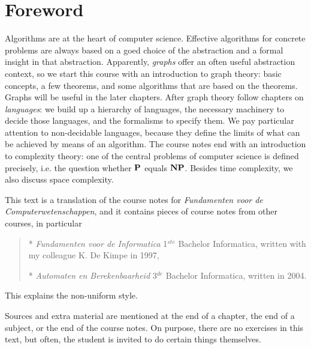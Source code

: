 \chapter{Foreword}

Algorithms are at the heart of computer science. Effective algorithms
for concrete problems are always based on a goed choice of the
abstraction and a formal insight in that abstraction. Apparently, {\em
graphs} offer an often useful abstraction context, so we start this
course with an introduction to graph theory: basic concepts, a few
theorems, and some algorithms that are based on the theorems. Graphs
will be useful in the later chapters. After graph theory follow
chapters on {\em languages}: we build up a hierarchy of languages,
the necessary machinery to decide those languages, and the formalisms
to specify them. We pay particular attention to non-decidable
languages, because they define the limits of what can be achieved by
means of an algorithm. The course notes end with an introduction to
complexity theory: one of the central problems of computer science is
defined precisely, i.e. the question whether $\P$ equals
$\NP$. Besides time complexity, we also discuss space complexity.


This text is a translation of the course notes for {\em Fundamenten
voor de Computerwetenschappen}, and it contains pieces of course
notes from other courses, in particular
\begin{verse}
* {\em Fundamenten voor de Informatica} 1$^{ste}$ Bachelor
Informatica, written with my colleague K. De Kimpe in 1997,

* {\em Automaten en Berekenbaarheid} 3$^{de}$ Bachelor Informatica,
written in 2004.
\end{verse}
This explains the non-uniform style.

Sources and extra material are mentioned at the end of a chapter, the
end of a subject, or the end of the course notes. On purpose, there
are no exercises in this text, but often, the student is invited to
do certain things themselves.

